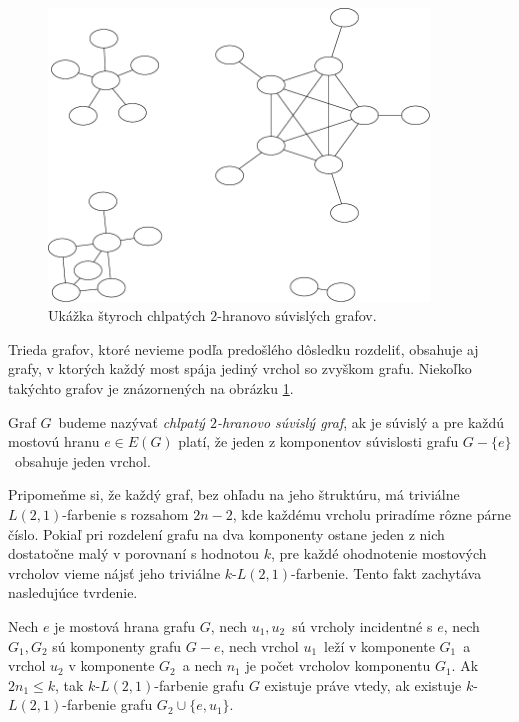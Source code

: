 \begin{figure}
\centerline{\includegraphics[width=0.9\textwidth]{images/ec2_example.pdf}}

\caption[Chlpaté $2$-hranovo súvislé grafy]{Ukážka štyroch
chlpatých $2$-hranovo súvislých grafov.}

\label{graf:ec2}
\end{figure}

Trieda grafov, ktoré nevieme podľa predošlého dôsledku rozdeliť, obsahuje aj grafy,
v ktorých každý most spája jediný vrchol so zvyškom grafu. Niekoľko takýchto grafov je
znázornených na obrázku \ref{graf:ec2}.

\begin{defn}
    Graf $G$ budeme nazývať \emph{chlpatý $2$-hranovo súvislý graf}, ak je súvislý a pre
    každú mostovú hranu $e \in E(G)$ platí, že jeden z komponentov súvislosti grafu
    $G - \{e\}$ obsahuje jeden vrchol.
\end{defn}

Pripomeňme si, že každý graf, bez ohľadu na jeho štruktúru, má triviálne $L(2,1)$-farbenie
s rozsahom $2n - 2$, kde každému vrcholu priradíme rôzne párne číslo. Pokiaľ pri rozdelení
grafu na dva komponenty ostane jeden z nich dostatočne malý v porovnaní s hodnotou $k$,
pre každé ohodnotenie mostových vrcholov vieme nájsť jeho triviálne $k$-$L(2,1)$-farbenie.
Tento fakt zachytáva nasledujúce tvrdenie.

\begin{lema}
    Nech $e$ je mostová hrana grafu $G$, nech $u_1, u_2$ sú vrcholy incidentné s $e$,
    nech $G_1, G_2$ sú komponenty grafu $G - e$, nech vrchol $u_1$ leží v komponente $G_1$ a vrchol $u_2$
    v komponente $G_2$ a
    nech $n_1$ je počet vrcholov komponentu $G_1$. Ak $2n_1 \leq k$, tak $k$-$L(2,1)$-farbenie
    grafu $G$ existuje práve vtedy, ak existuje $k$-$L(2,1)$-farbenie grafu $G_2 \cup \{e, u_1\}$.
\end{lema}

